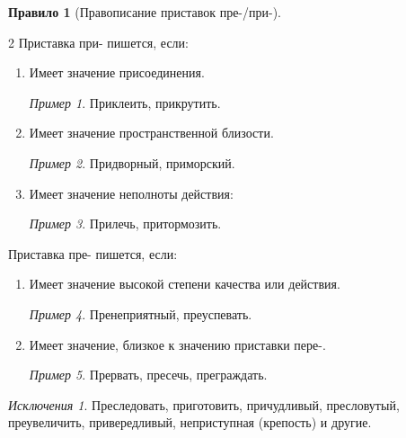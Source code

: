 \documentclass[12pt]{article}
\theoremstyle{definition}
\newtheorem{rrule}{Правило}[section]
\theoremstyle{remark}
\newtheorem*{example}{Пример}
\newtheorem*{exception}{Исключения}
\begin{document}
\begin{rrule}[Правописание приставок пре-/при-]
    \hfill
    \begin{multicols}{2}
        Приставка при- пишется, если:
        \begin{enumerate}
            \item Имеет значение присоединения.
            \begin{example}
                Приклеить, прикрутить.
            \end{example}
            \item Имеет значение пространственной близости.
            \begin{example}
                Придворный, приморский.
            \end{example}
            \item Имеет значение неполноты действия:
            \begin{example}
                Прилечь, притормозить.
            \end{example}
        \end{enumerate}
        Приставка пре- пишется, если:
        \begin{enumerate}
            \item Имеет значение высокой степени качества или действия.
            \begin{example}
                Пренеприятный, преуспевать.
            \end{example}
            \item Имеет значение, близкое к значению приставки пере-.
            \begin{example}
                Прервать, пресечь, преграждать.
            \end{example}
        \end{enumerate}
    \end{multicols}
    \begin{exception}
        Преследовать, приготовить, причудливый, пресловутый, преувеличить, привередливый, неприступная (крепость) и другие.
    \end{exception}
\end{rrule}
\end{document}
